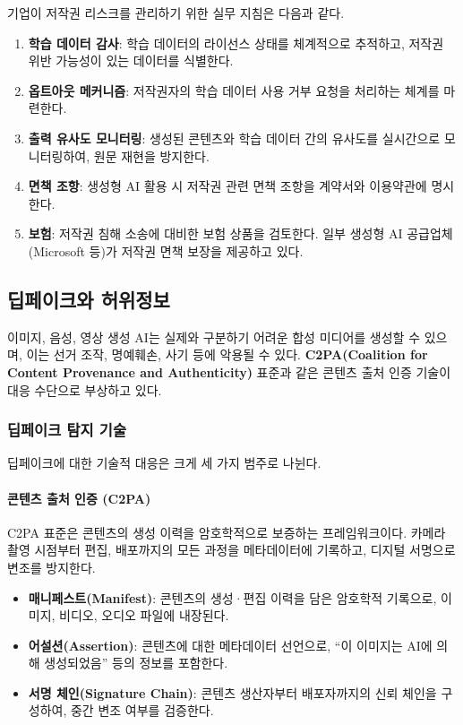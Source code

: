 기업이 저작권 리스크를 관리하기 위한 실무 지침은 다음과 같다.

\begin{enumerate}
 \item \textbf{학습 데이터 감사}: 학습 데이터의 라이선스 상태를 체계적으로 추적하고, 저작권 위반 가능성이 있는 데이터를 식별한다.
 \item \textbf{옵트아웃 메커니즘}: 저작권자의 학습 데이터 사용 거부 요청을 처리하는 체계를 마련한다.
 \item \textbf{출력 유사도 모니터링\cite{klaise2021monitoring}}: 생성된 콘텐츠와 학습 데이터 간의 유사도를 실시간으로 모니터링하여, 원문 재현을 방지한다.
 \item \textbf{면책 조항}: 생성형 AI 활용 시 저작권 관련 면책 조항을 계약서와 이용약관에 명시한다.
 \item \textbf{보험}: 저작권 침해 소송에 대비한 보험 상품을 검토한다. 일부 생성형 AI 공급업체(Microsoft 등)가 저작권 면책 보장을 제공하고 있다.
\end{enumerate}

\subsection{딥페이크와 허위정보}
\label{sec:gen.1.3}

이미지, 음성, 영상 생성 AI는 실제와 구분하기 어려운 합성 미디어를 생성할 수 있으며, 이는 선거 조작, 명예훼손, 사기 등에 악용될 수 있다. \textbf{C2PA(Coalition for Content Provenance and Authenticity)} 표준과 같은 콘텐츠 출처 인증 기술이 대응 수단으로 부상하고 있다.

\subsubsection{딥페이크 탐지 기술}

딥페이크에 대한 기술적 대응은 크게 세 가지 범주로 나뉜다.

\paragraph{콘텐츠 출처 인증 (C2PA)}
C2PA 표준은 콘텐츠의 생성 이력을 암호학적으로 보증하는 프레임워크이다. 카메라 촬영 시점부터 편집, 배포까지의 모든 과정을 메타데이터에 기록하고, 디지털 서명으로 변조를 방지한다.

\begin{itemize}
 \item \textbf{매니페스트(Manifest)}: 콘텐츠의 생성·편집 이력을 담은 암호학적 기록으로, 이미지, 비디오, 오디오 파일에 내장된다.
 \item \textbf{어설션(Assertion)}: 콘텐츠에 대한 메타데이터 선언으로, ``이 이미지는 AI에 의해 생성되었음'' 등의 정보를 포함한다.
 \item \textbf{서명 체인(Signature Chain)}: 콘텐츠 생산자부터 배포자까지의 신뢰 체인을 구성하여, 중간 변조 여부를 검증한다.
\end{itemize}

